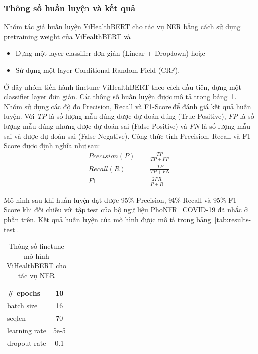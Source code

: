 \subsubsection{Thông số huấn luyện và kết quả}
Nhóm tác giả huấn luyện ViHealthBERT cho tác vụ NER bằng cách sử dụng pretraining weight của ViHealthBERT và
\begin{itemize}
\item Dựng một layer classifier đơn giản (Linear + Dropdown) hoặc
\item Sử dụng một layer Conditional Random Field (CRF).
\end{itemize}
Ở đây nhóm tiến hành finetune ViHealthBERT theo cách đầu tiên, dựng một classifier layer đơn giản. Các thông số huấn luyện được mô tả trong bảng~\ref{tab:configurations}. Nhóm sử dụng các độ đo Precision, Recall và F1-Score để đánh giá kết quả huấn luyện. Với \textit{TP} là số lượng mẫu đúng được dự đoán đúng (True Positive), \textit{FP} là số lượng mẫu đúng nhưng được dự đoán sai (False Positive) và \textit{FN} là số lượng mẫu sai và được dự đoán sai (False Negative). Công thức tính Precision, Recall và F1-Score được định nghĩa như sau:
\begin{equation*}
\begin{aligned}
Precision (P) &= \frac{TP}{TP + FP} \\
Recall (R) &= \frac{TP}{TP + FN} \\
F1 &= \frac{2PR}{P + R}
\end{aligned}
\end{equation*}

Mô hình sau khi huấn luyện đạt được 95\% Precision, 94\% Recall và 95\% F1-Score khi đối chiếu với tập test của bộ ngữ liệu PhoNER\_COVID-19 đã nhắc ở phần trên. Kết quả huấn luyện của mô hình được mô tả trong bảng~\ref{tab:results-test}.
\begin{table}
\centering
\begin{tabular}{|l|c|}
\hline
\# epochs & 10 \\
\hline
batch size & 16 \\
\hline
seqlen & 70 \\
\hline
learning rate & 5e-5 \\
\hline
dropout rate & 0.1 \\
\hline
\end{tabular}
\caption{Thông số finetune mô hình ViHealthBERT cho tác vụ NER}
\label{tab:configurations}
\end{table}

